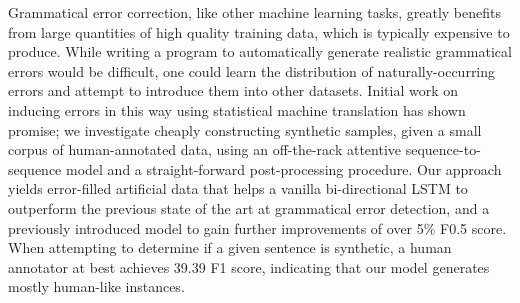 Grammatical error correction, like other machine learning tasks, greatly benefits from large quantities of high quality training data, which is typically expensive to produce. While writing a program to automatically generate realistic grammatical errors would be difficult, one could learn the distribution of naturally-occurring errors and attempt to introduce them into other datasets. Initial work on inducing errors in this way using statistical machine translation has shown promise; we investigate cheaply constructing synthetic samples, given a small corpus of human-annotated data, using an off-the-rack attentive sequence-to-sequence model and a straight-forward post-processing procedure. Our approach yields error-filled artificial data that helps a vanilla bi-directional LSTM to outperform the previous state of the art at grammatical error detection, and a previously introduced model to gain further improvements of over 5\% F0.5 score. When attempting to determine if a given sentence is synthetic, a human annotator at best achieves 39.39 F1 score, indicating that our model generates mostly human-like instances.
